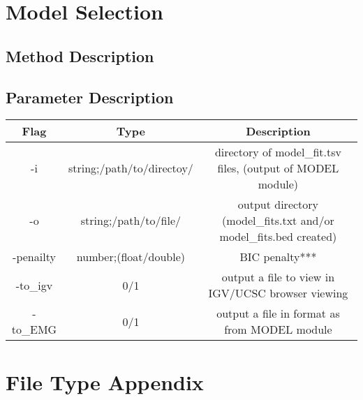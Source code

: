 \documentclass{article}
\theoremstyle{definition}
\begin{document}
\begin{center}
\begin{tabular}{ |c|c|c| }
\end{tabular}
\end{center}

\section{Model Selection}
\subsection{Method Description}
\subsection{Parameter Description}
 \begin{center}
\begin{tabular}{ |c|c|c| } 
 \hline
 Flag & Type & Description \\ 
 \hline
 \hline
 -i & string;/path/to/directoy/ &directory of model\_fit.tsv files, (output of MODEL module) \\ 
 \hline
 -o & string;/path/to/file/ & output directory (model\_fits.txt and/or model\_fits.bed created) \\ 
 \hline
 -penailty & number;(float/double) & BIC penalty*** \\ 
 \hline
 -to\_igv & 0/1 & output a file to view in IGV/UCSC browser viewing \\ 
 \hline
 -to\_EMG & 0/1 & output a file in format as from MODEL module \\ 
 \hline
\end{tabular}
\end{center}

\section{File Type Appendix} 
 
\end{document}
